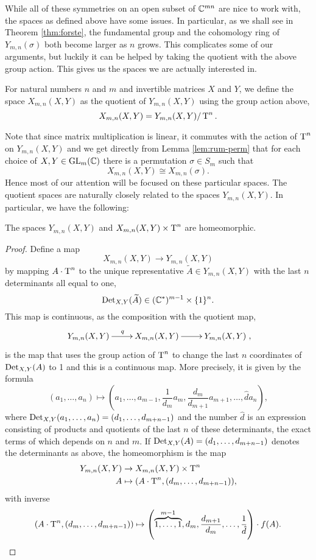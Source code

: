 While all of these symmetries on an open subset of $\mathbb{C}^{mn}$ are nice
to work with, the spaces as defined above have some issues. In
particular, as we shall see in Theorem \ref{thm:forste}, the
fundamental group and the cohomology ring of
$Y_{m,n}(\sigma)$ both become larger as $n$ grows. This complicates
some of our arguments, but luckily it can be helped by taking the
quotient with the above group action. This gives us the spaces we are
actually interested in.

\begin{definition}
  For natural numbers $n$ and $m$ and invertible matrices $X$ and $Y$,
  we define the space $X_{m,n}(X,Y)$ as the quotient of $Y_{m,n}(X,Y)$
  using the group action above,
  \[ X_{m,n}(X,Y) = Y_{m,n}(X,Y) / \operatorname{T}^n. \]
\end{definition}

Note that since matrix multiplication is linear, it commutes with the
action of $\operatorname{T}^n$ on $Y_{m,n}(X,Y)$ and we get directly from Lemma
\ref{lem:rum-perm} that for each choice of $X,Y\in \operatorname{GL}_m(\mathbb{C})$ there is
a permutation $\sigma \in S_m$ such that
\[ X_{m,n}(X,Y) \cong X_{m,n}(\sigma). \]
Hence most of our attention will be focused on these particular
spaces. The quotient spaces are naturally closely related to the
spaces $Y_{m,n}(X,Y)$. In particular, we have the following:

\begin{lemma}
  \label{lem:reduktion}
  The spaces $Y_{m,n}(X,Y)$ and $X_{m,n}(X,Y) \times \operatorname{T}^n$ are homeomorphic.
\end{lemma}
\begin{proof}
  Define a map
  \[ X_{m,n}(X,Y) \to Y_{m,n}(X,Y) \]
  by mapping $A\cdot \operatorname{T}^n$ to the unique representative
  $\widetilde{A} \in Y_{m,n}(X,Y)$ with the last
  $n$ determinants all equal to one,
  \[ \operatorname{Det}_{X,Y}(\widetilde{A}) \in (\mathbb{C}^*)^{m-1} \times
  \{1\}^n. \]
  This map is continuous, as the composition with the quotient map,
  \[ \xymatrix{Y_{m,n}(X,Y) \ar[r]^q & X_{m,n}(X,Y) \ar[r] &
    Y_{m,n}(X,Y)}, \]
  is the map that uses the group action of $\operatorname{T}^n$ to change the last
  $n$ coordinates of $\operatorname{Det}_{X,Y}(A)$ to 1 and this is a continuous
  map. More precisely, it is given by the formula
  \[ (a_1,\dots,a_n) \mapsto \left(a_1,\dots,a_{m-1},\frac{1}{d_m}a_m,
    \frac{d_m}{d_{m+1}} a_{m+1},\dots,\hat{d}a_n\right), \]
  where $\operatorname{Det}_{X,Y}(a_1,\dots,a_n) = (d_1,\dots,d_{m+n-1})$ and the
  number $\hat{d}$ is an expression consisting of products and
  quotients of the last $n$ of these
  determinants, the exact terms of which depends on $n$ and $m$. If
  $\operatorname{Det}_{X,Y}(A) = (d_1,\dots,d_{m+n-1})$ denotes the determinants as
  above, the homeomorphism is the map
  \begin{align*}
    Y_{m,n}(X,Y) &\to X_{m,n}(X,Y) \times \operatorname{T}^n\\
    A &\mapsto (A\cdot \operatorname{T}^n, (d_m,\dots,d_{m+n-1})),
  \end{align*}
  with inverse
  \[ (A\cdot \operatorname{T}^n, (d_m,\dots, d_{m+n-1})) \mapsto
  \left(\overbrace{1,\dots,1}^{m-1},d_m,\frac{d_{m+1}}{d_m},\dots,
    \frac{1}{\hat{d}}\right) \cdot f(A). \]
\end{proof}

